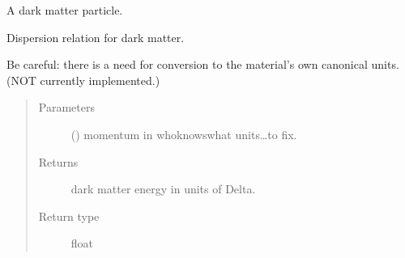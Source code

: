 \documentclass[letterpaper,10pt,english]{sphinxmanual}
\begin{document}
\begin{fulllineitems}
\label{\detokenize{code_structure:scdc.particle.DarkMatter}}
A dark matter particle.

\begin{fulllineitems}
\label{\detokenize{code_structure:scdc.particle.DarkMatter.dispersion}}
Dispersion relation for dark matter.

Be careful: there is a need for conversion to the material’s own
canonical units. (NOT currently implemented.)
\begin{quote}\begin{description}
\item[{Parameters}] \leavevmode
{} () \textendash{} momentum in who\sphinxhyphen{}knows\sphinxhyphen{}what units…to fix.

\item[{Returns}] \leavevmode
dark matter energy in units of Delta.

\item[{Return type}] \leavevmode
float

\end{description}\end{quote}

\end{fulllineitems}


\end{fulllineitems}

\end{document}
